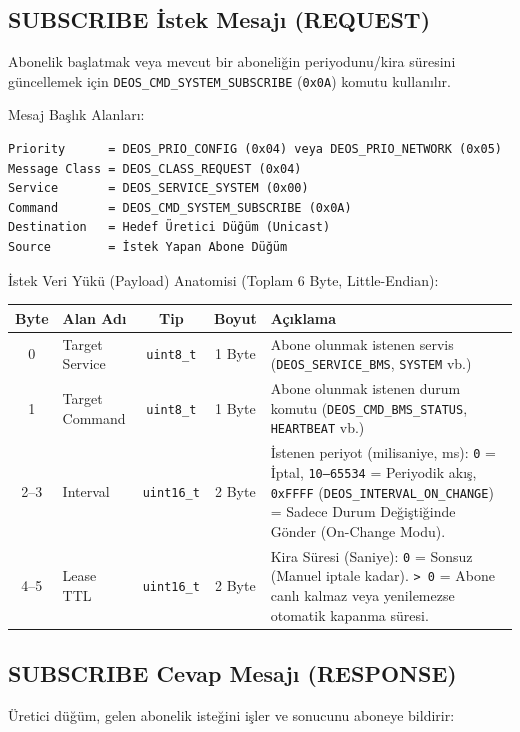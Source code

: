 \documentclass[a4paper,10pt]{article}
\newcommand{\hex}[1]{\texttt{0x#1}}
\newcommand{\code}[1]{\texttt{#1}}
\begin{document}
\subsection{SUBSCRIBE İstek Mesajı (REQUEST)}

Abonelik başlatmak veya mevcut bir aboneliğin periyodunu/kira süresini güncellemek için
\code{DEOS\_CMD\_SYSTEM\_SUBSCRIBE} (\hex{0A}) komutu kullanılır.

Mesaj Başlık Alanları:
\begin{verbatim}
Priority      = DEOS_PRIO_CONFIG (0x04) veya DEOS_PRIO_NETWORK (0x05)
Message Class = DEOS_CLASS_REQUEST (0x04)
Service       = DEOS_SERVICE_SYSTEM (0x00)
Command       = DEOS_CMD_SYSTEM_SUBSCRIBE (0x0A)
Destination   = Hedef Üretici Düğüm (Unicast)
Source        = İstek Yapan Abone Düğüm
\end{verbatim}

İstek Veri Yükü (Payload) Anatomisi (Toplam 6 Byte, Little-Endian):

\begin{center}
\begin{tabularx}{\textwidth}{c l c c X}
\toprule
Byte & Alan Adı & Tip & Boyut & Açıklama \\
\midrule
0 & Target Service & \code{uint8\_t} & 1 Byte & Abone olunmak istenen servis (\code{DEOS\_SERVICE\_BMS}, \code{SYSTEM} vb.) \\
1 & Target Command & \code{uint8\_t} & 1 Byte & Abone olunmak istenen durum komutu (\code{DEOS\_CMD\_BMS\_STATUS}, \code{HEARTBEAT} vb.) \\
2--3 & Interval & \code{uint16\_t} & 2 Byte & İstenen periyot (milisaniye, ms): \code{0} = İptal, \code{10--65534} = Periyodik akış, \hex{FFFF} (\code{DEOS\_INTERVAL\_ON\_CHANGE}) = Sadece Durum Değiştiğinde Gönder (On-Change Modu). \\
4--5 & Lease TTL & \code{uint16\_t} & 2 Byte & Kira Süresi (Saniye): \code{0} = Sonsuz (Manuel iptale kadar). \code{> 0} = Abone canlı kalmaz veya yenilemezse otomatik kapanma süresi. \\
\bottomrule
\end{tabularx}
\end{center}

\subsection{SUBSCRIBE Cevap Mesajı (RESPONSE)}

Üretici düğüm, gelen abonelik isteğini işler ve sonucunu aboneye bildirir:
\end{document}

